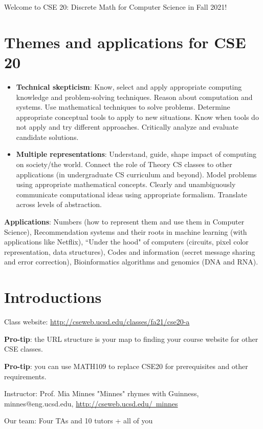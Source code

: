 \documentclass[12pt, oneside]{article}
\begin{document}
\newpage
Welcome to CSE 20: Discrete Math for Computer Science in Fall 2021! 

\section*{Themes and applications for CSE 20}
\begin{itemize}
\item {\bf Technical skepticism}: Know, select and apply appropriate computing knowledge and problem-solving techniques. 
Reason about computation and systems. 
Use mathematical techniques to solve problems. 
Determine appropriate conceptual tools to apply to new situations. 
Know when tools do not apply and try different approaches. 
Critically analyze and evaluate candidate solutions.
\item {\bf Multiple representations}: Understand, guide, shape impact of computing on society/the world. 
Connect the role of Theory CS classes to other applications (in undergraduate CS curriculum and beyond). 
Model problems using appropriate mathematical concepts.
Clearly and unambiguously communicate computational ideas using appropriate formalism. 
Translate across levels of abstraction.
\end{itemize}

{\bf Applications}: Numbers (how to represent them and use them in Computer Science), 
Recommendation systems and their roots in machine learning (with applications like Netflix),
``Under the hood" of computers (circuits, pixel color representation, data structures),
Codes and information (secret message sharing and error correction),
Bioinformatics algorithms and genomics (DNA and RNA).

\section*{Introductions}
Class website: \href{http://cseweb.ucsd.edu/classes/fa21/cse20-a}{http://cseweb.ucsd.edu/classes/fa21/cse20-a}

{\bf Pro-tip}: the URL structure is your map to finding your course website for other CSE classes.

{\bf Pro-tip}: you can use MATH109 to replace CSE20 for prerequisites and other requirements.

Instructor: Prof. Mia Minnes {\tiny{"Minnes" rhymes with Guinness}}, minnes@eng.ucsd.edu, 
\href{http://cseweb.ucsd.edu/~minnes}{http://cseweb.ucsd.edu/~minnes}

Our team: Four TAs and 10 tutors + all of you
\end{document}
